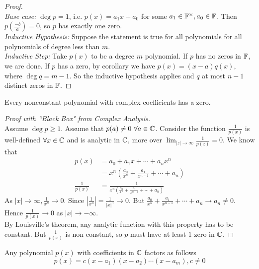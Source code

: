 \begin{proof} $ $ \\
    \textit{Base case:} $\deg p = 1$, i.e. $p(x) = a_1x + a_0$ for some $a_1 \in \mathbb F^\times, a_0 \in \mathbb F$. Then $p\left(\frac{-b}{a}\right) = 0$, so $p$ has exactly one zero. \\
    \textit{Inductive Hypothesis:} Suppose the statement is true for all polynomials for all polynomials of degree less than $m$. \\
    \textit{Inductive Step:} Take $p(x)$ to be a degree $m$ polynomial. If $p$ has no zeros in $\mathbb F$, we are done. If $p$ has a zero, by corollary we have $p(x) = (x - a)q(x)$, where $\deg q = m - 1$. So the inductive hypothesis applies and $q$ at most $n-1$ distinct zeros in $\mathbb F$.
\end{proof}
\begin{theorem}
    Every nonconstant polynomial with complex coefficients has a zero.
\end{theorem}
\begin{proof}[Proof with ``Black Box" from Complex Analysis] $ $ \\
    Assume $\deg p \geq 1$. Assume that $p(a) \neq 0 \ \forall a \in \mathbb C$. Consider the function $\frac{1}{p(x)}$ is well-defined $\forall x \in \mathbb C$ and is analytic in $\mathbb C$, more over $\lim_{|z| \to \infty} \frac{1}{p(z)} = 0$. We know that 
    \begin{align*}
        p(x) &= a_0 + a_1 x + \cdots + a_n x^n \\
        &= x^n \left( \frac{a_0}{x^n} + \frac{a_1}{x^{n-1}} + \cdots + a_n\right) \\
        \frac{1}{p(x)} &= \frac{1}{x^n \left( \frac{a_0}{x^n} + \frac{a_1}{x^{n-1}} + \cdots + a_n\right)} 
    \end{align*}
    As $\displaystyle |x| \to \infty, \displaystyle \frac{1}{x^n} \to 0$. Since $\displaystyle \left|\frac{1}{x^n}\right| = \frac{1}{|x|^n} \to 0$. But $\displaystyle \frac{a_0}{x^n} + \frac{a_1}{x^{n-1}} + \cdots + a_n \to a_n \neq 0$. Hence $\displaystyle \frac{1}{p(x)} \to 0$ as $|x| \to -\infty$. \\
    By Louisville's theorem, any analytic function with this property has to be constant. But $\frac{1}{p(x)}$ is non-constant, so $p$ must have at least $1$ zero in $\mathbb C$.
\end{proof}
\begin{corollary}
    Any polynomial $p(x)$ with coefficients in $\mathbb C$ factors as follows 
    \[ p(x) = c(x - a_1)(x - a_2) \cdots (x - a_m), c \neq 0\]
\end{corollary}
